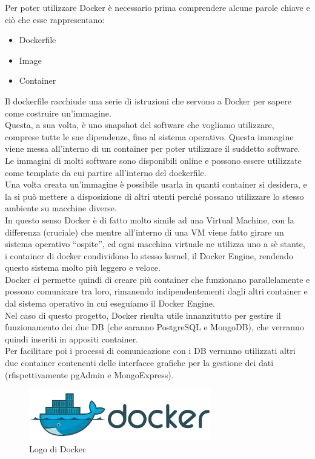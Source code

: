 \noindent Per poter utilizzare Docker è necessario prima comprendere alcune parole chiave e ciò che esse rappresentano:
\begin{itemize}
    \item Dockerfile
    \item Image
    \item Container
\end{itemize}
Il dockerfile racchiude una serie di istruzioni che servono a Docker per sapere come costruire un'immagine.\\
Questa, a sua volta, è uno snapshot del software che vogliamo utilizzare, comprese tutte le sue dipendenze, fino al sistema operativo. Questa immagine viene messa all'interno di un container per poter utilizzare il suddetto software.\\
Le immagini di molti software sono disponibili online e possono essere utilizzate come template da cui partire all'interno del dockerfile.\\
Una volta creata un'immagine è possibile usarla in quanti container si desidera, e la si può mettere a disposizione di altri utenti perché possano utilizzare lo stesso ambiente su macchine diverse.\\
In questo senso Docker è di fatto molto simile ad una Virtual Machine, con la differenza (cruciale) che mentre all'interno di una VM viene fatto girare un sistema operativo ``ospite'', ed ogni macchina virtuale ne utilizza uno a sè stante, i container di docker condividono lo stesso kernel, il Docker Engine, rendendo questo sistema molto più leggero e veloce.\\
Docker ci permette quindi di creare più container che funzionano parallelamente e possono comunicare tra loro, rimanendo indipendentementi dagli altri container e dal sistema operativo in cui eseguiamo il Docker Engine.\\

\noindent Nel caso di questo progetto, Docker risulta utile innanzitutto per gestire il funzionamento dei due DB (che saranno PostgreSQL e MongoDB), che verranno quindi inseriti in appositi container.\\
Per facilitare poi i processi di comunicazione con i DB verranno utilizzati altri due container contenenti delle interfacce grafiche per la gestione dei dati (rfispettivamente pgAdmin e MongoExpress).

\begin{figure}[htbp]
\begin{center}
\includegraphics[height=6em]{immagini/tecnologies-logos/Docker-Logo.png}
\caption{Logo di Docker}
\end{center}
\end{figure}

